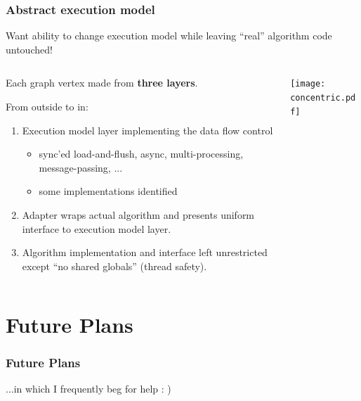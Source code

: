 \documentclass[xcolor=dvipsnames]{beamer}
\begin{document}
\begin{frame}
  \frametitle{Abstract execution model}

  \scriptsize Want ability to change execution model while leaving ``real'' algorithm code untouched!

\footnotesize
  
  \begin{columns}
    \begin{column}{0.65\textwidth}
      Each graph vertex made from \textbf{three layers}.\\

      \vspace{2mm}

      From outside to in:
      \begin{enumerate}
      \item Execution model layer implementing the data flow control
        \begin{itemize}\scriptsize
        \item sync'ed load-and-flush, async, multi-processing, message-passing, ...
        \item some implementations identified
        \end{itemize}
      \item Adapter wraps actual algorithm and presents uniform
        interface to execution model layer.
      \item Algorithm implementation and interface left unrestricted
        except ``no shared globals'' (thread safety).
      \end{enumerate}
    \end{column}
    \begin{column}{0.35\textwidth}
      \texttt{[image: concentric.pdf]}      
    \end{column}
  \end{columns}

\end{frame}

\section{Future Plans}

\begin{frame}
\end{frame}

\begin{frame}\frametitle{Future Plans}
  \begin{center}
    ...in which I frequently beg for help : )
  \end{center}
\end{frame}
\end{document}
